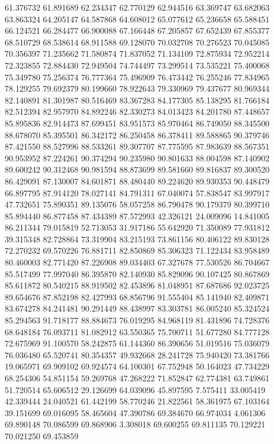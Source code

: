 61.376732
61.891689
62.234347
62.770129
62.944516
63.369747
63.682063
63.863324
64.205147
64.587868
64.608012
65.077612
65.236658
65.588451
66.124521
66.284477
66.900088
67.166448
67.205857
67.652439
67.855377
68.510729
68.538614
68.911588
69.128070
70.032708
70.276523
70.045085
70.356397
71.235662
71.580874
71.837052
71.134109
72.875934
72.952214
72.323855
72.884430
72.949504
74.744497
73.299514
73.535221
75.400068
75.349780
75.256374
76.777364
75.496909
76.473442
76.255246
77.834965
78.129255
79.692379
80.199660
78.922643
79.330969
79.437677
80.969344
82.140891
81.301987
80.516469
83.367283
84.177305
85.138295
81.766184
82.512394
82.957970
84.892246
82.330273
84.013423
84.201780
87.448657
85.895836
82.914473
87.699451
83.951573
85.970464
86.749050
88.345500
88.678070
85.395501
86.342172
86.250458
86.378411
89.588865
90.379746
87.421550
88.527996
88.533261
89.307707
87.775595
87.983639
88.567351
90.953952
87.224261
90.374294
90.235980
90.801633
88.004598
87.140902
89.600242
90.312468
90.981594
88.873699
89.581660
89.816837
89.300520
86.429091
87.130007
84.601871
88.480440
89.224620
89.930353
90.448479
66.897795
87.914120
78.027141
84.791311
67.040074
57.838547
83.997917
47.732651
75.890351
89.135076
58.057258
86.790478
90.179379
80.399710
85.894440
86.877458
87.434389
87.572993
42.326121
24.009096
14.841005
86.211344
79.015819
52.713053
31.917186
55.642920
71.350089
77.931812
39.315348
82.728864
73.319904
83.215193
73.861156
80.406122
89.830128
72.270232
69.570226
76.881711
82.850869
85.306323
71.122434
83.958489
80.460003
82.771420
87.226908
89.034403
67.327678
77.530526
86.704667
85.517499
77.997040
86.395870
82.140930
85.829096
90.107425
80.867869
85.611872
80.540215
88.919502
82.453896
81.048951
87.687686
92.023725
89.654676
87.852198
82.427993
68.856796
91.555404
85.141940
82.409871
83.674278
84.241481
90.291449
88.438997
83.303781
86.005240
85.324524
85.294563
91.718177
88.884673
76.019295
84.968119
81.431896
74.728376
68.648184
76.093711
81.082912
63.550365
75.700711
51.677280
84.777128
72.675969
91.100570
58.242875
61.144360
86.390656
51.019516
75.036079
76.036480
65.520741
80.354357
49.932668
28.241728
75.940420
73.381766
19.065971
69.909102
69.924574
64.100301
67.752948
50.164023
47.734229
68.254306
54.851154
59.269768
47.268222
71.852847
62.774381
63.749861
51.720514
65.606512
29.126699
64.039096
45.897595
7.575411
33.005419
42.339444
24.040521
61.442199
58.770246
21.822561
58.361975
67.103164
39.151699
69.016095
58.465604
47.390786
69.384670
66.974034
4.061306
69.890148
70.086599
69.868906
3.308018
69.600255
69.811135
70.129221
70.021250
69.453859

